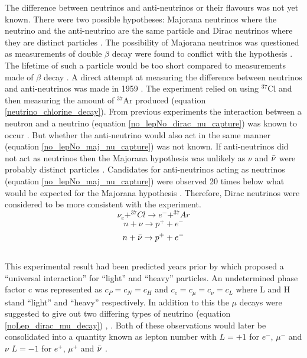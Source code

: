 The difference between neutrinos and anti-neutrinos or their flavours was not yet known. There were two possible hypotheses: Majorana neutrinos where the neutrino and the anti-neutrino are the same particle and Dirac neutrinos where they are distinct particles \cite{griffiths2008book} \cite{griffiths2008neutrino1.5} \cite{cowan1957test}. The possibility of Majorana neutrinos was questioned as measurements of double $\beta$ decay were found to conflict with the hypothesis \cite{cowan1957test}. The lifetime of such a particle would be too short compared to measurements made of $\beta$ decay \cite{cowan1957test}. A direct attempt at measuring the difference between neutrinos and anti-neutrinos was made in 1959 \cite{davis1959attempt}. The experiment relied on using $^{37}$Cl and then measuring the amount of $^{37}$Ar produced (equation \ref{neutrino_chlorine_decay}). From previous experiments the interaction between a neutron and a neutrino (equation \ref{no_lepNo_dirac_nu_capture}) was known to occur \cite{Cowan1956Confirmation}. But whether the anti-neutrino would also act in the same manner (equation \ref{no_lepNo_maj_nu_capture}) was not known. If anti-neutrinos did not act as neutrinos then the Majorana hypothesis was unlikely as $\nu$ and $\Bar{\nu}$ were probably distinct particles \cite{griffiths2008book} \cite{griffiths2008neutrino1.5} \cite{davis1959attempt}. Candidates for anti-neutrinos acting as neutrinos (equation \ref{no_lepNo_maj_nu_capture}) were observed 20 times below what would be expected for the Majorana hypothesis \cite{davis1959attempt}. Therefore, Dirac neutrinos were considered to be more consistent with the experiment. 
\begin{equation}
    \nu_e + ^{37}Cl \rightarrow  e^- + ^{37}Ar
    \label{neutrino_chlorine_decay}
\end{equation}
\begin{equation}
    n + \nu \rightarrow p^+ + e^-
    \label{no_lepNo_dirac_nu_capture}
\end{equation}
\begin{equation}
    n + \Bar{\nu} \rightarrow p^+ + e^-
    \label{no_lepNo_maj_nu_capture}
\end{equation}
\\This experimental result had been predicted years prior by \cite{konopinski1953universal} which proposed a ``universal interaction'' for ``light'' and ``heavy'' particles. An undetermined phase factor c was represented as $c_P=c_N=c_H$ and $c_e=c_\mu=c_\nu=c_L$ where L and H stand ``light'' and ``heavy'' respectively. In addition to this the $\mu$ decays were suggested to give out two differing types of neutrino (equation \ref{noLep_dirac_mu_decay}) \cite{griffiths2008book} \cite{griffiths2008neutrino1.5}, \cite{konopinski1953universal}. Both of these observations would later be consolidated into a quantity known as lepton number with $L=+1$ for $e^-$, $\mu^-$ and $\nu$ $L=-1$ for $e^+$, $\mu^+$ and $\Bar{\nu}$ \cite{griffiths2008book}\cite{griffiths2008neutrino1.5}. 
